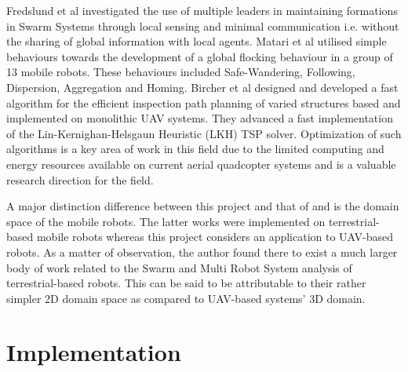 \documentclass{report}
\begin{document}
Fredslund et al \cite{Fredslund2002} investigated the use of multiple leaders in maintaining formations in Swarm Systems through local sensing and minimal communication i.e. without the sharing of global information with local agents. Matari et al \cite{Matari1995} utilised simple behaviours towards the development of a global flocking behaviour in a group of 13 mobile robots. These behaviours included Safe-Wandering, Following, Dispersion, Aggregation and Homing. Bircher et al \cite{Bircher2015} designed and developed a fast algorithm for the efficient inspection path planning of varied structures based and implemented on monolithic UAV systems. They advanced a fast implementation of the Lin-Kernighan-Helsgaun Heuristic (LKH) TSP solver. Optimization of such algorithms is a key area of work in this field due to the limited computing and energy resources available on current aerial quadcopter systems and is a valuable research direction for the field.

A major distinction difference between this project and that of \cite{Matari1995} and \cite{Fredslund2002} is the domain space of the mobile robots. The latter works were implemented on terrestrial-based mobile robots whereas this project considers an application to UAV-based robots. As a matter of observation, the author found there to exist a much larger body of work related to the Swarm and Multi Robot System analysis of terrestrial-based robots. This can be said to be attributable to their rather simpler 2D domain space as compared to UAV-based systems' 3D domain.

\chapter{Implementation} \label{implementation}
\end{document}
